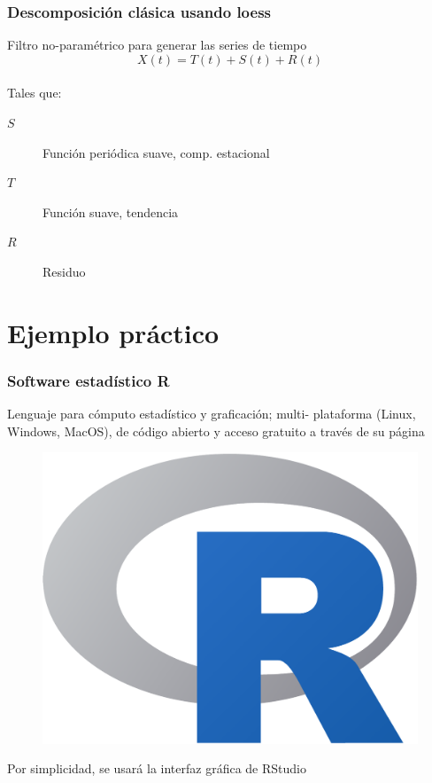 \documentclass[11pt]{beamer}
\begin{document}
\begin{frame}\frametitle{Descomposición clásica usando loess}

Filtro no-paramétrico para generar las series de tiempo
\begin{equation*}
X(t) = T(t) + S(t) + R(t)
\end{equation*}\\

Tales que:\\
\begin{description}
\item[$S$] Función periódica suave, comp. estacional
\item[$T$] Función suave, tendencia
\item[$R$] Residuo
\end{description}

\end{frame}




\section{Ejemplo práctico}

\begin{frame}\frametitle{Software estadístico R}

Lenguaje para cómputo estadístico y graficación; multi- plataforma (Linux, Windows, MacOS), 
de código abierto y acceso gratuito a través de su página
\href{https://www.r-project.org/}{}

\begin{figure}
\centering
\includegraphics[width=0.4\linewidth]{./curso_scripts/r_logo.pdf}
\end{figure}

Por simplicidad, se usará la interfaz gráfica de RStudio
\href{https://www.rstudio.com/}{}
\end{frame}
\end{document}
